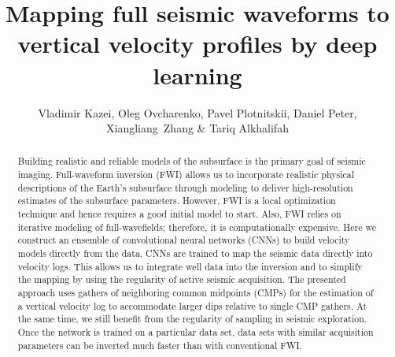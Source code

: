 \documentclass[paper,twocolomn]{geophysics}
\begin{document}
\title{Mapping full seismic waveforms to vertical velocity profiles by deep learning}

\renewcommand{\thefootnote}{\fnsymbol{footnote}} 

\author{Vladimir Kazei, Oleg Ovcharenko, Pavel Plotnitskii, Daniel Peter, Xiangliang~Zhang \& Tariq Alkhalifah}
\address{
King Abdullah University of Science and Technology (KAUST), Thuwal, 23955-6900, Saudi Arabia \\
vladimir.kazei@kaust.edu.sa, oleg.ovcharenko@kaust.edu.sa, pavel.plotnitskii@kaust.edu.sa, \\
daniel.peter@kaust.edu.sa, xiangliang.zhang@kaust.edu.sa, tariq.alkhalifah@kaust.edu.sa}



\maketitle

\begin{abstract}
	Building realistic and reliable models of the subsurface is the primary goal of seismic imaging.
	Full-waveform inversion (FWI) allows us to incorporate realistic physical descriptions of the Earth’s subsurface through modeling to deliver high-resolution estimates of the subsurface parameters.
	However, FWI is a local optimization technique and hence requires a good initial model to start. Also, FWI relies on iterative modeling of full-wavefields; therefore, it is computationally expensive.
	Here we construct an ensemble of convolutional neural networks (CNNs) to build velocity models directly from the data.
	CNNs are trained to map the seismic data directly into velocity logs. This allows us to integrate well data into the inversion and to simplify the mapping by using the regularity of active seismic acquisition. 
	The presented approach uses gathers of neighboring common midpoints (CMPs) for the estimation of a vertical velocity log to accommodate larger dips relative to single CMP gathers. At the same time, we still benefit from the regularity of sampling in seismic exploration. 
	Once the network is trained on a particular data set, data sets with similar acquisition parameters can be inverted much faster than with conventional FWI.
\end{abstract}

\end{document}
